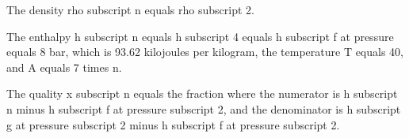 The density rho subscript n equals rho subscript 2.

The enthalpy h subscript n equals h subscript 4 equals h subscript f at pressure equals 8 bar, which is 93.62 kilojoules per kilogram, the temperature T equals 40, and A equals 7 times n.

The quality x subscript n equals the fraction where the numerator is h subscript n minus h subscript f at pressure subscript 2, and the denominator is h subscript g at pressure subscript 2 minus h subscript f at pressure subscript 2.